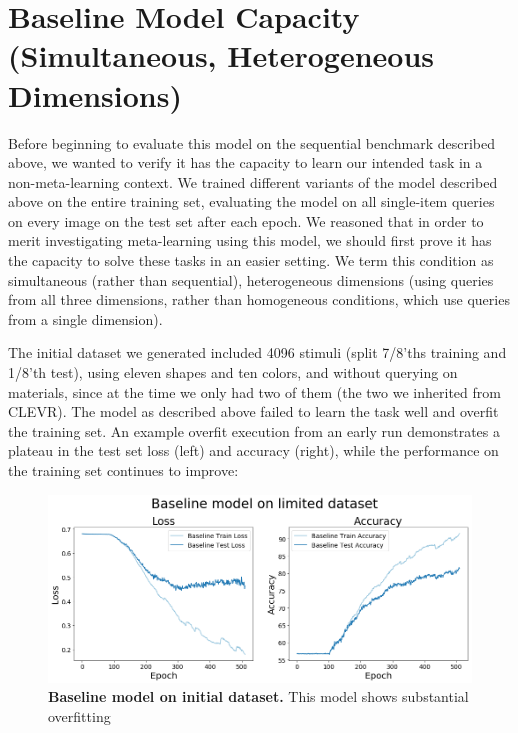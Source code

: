 \section{Baseline Model Capacity (Simultaneous, Heterogeneous Dimensions)}
Before beginning to evaluate this model on the sequential benchmark described above, we wanted to verify it has the capacity to learn our intended task in a non-meta-learning context. We trained different variants of the model described above on the entire training set, evaluating the model on all single-item queries on every image on the test set after each epoch. We reasoned that in order to merit investigating meta-learning using this model, we should first prove it has the capacity to solve these tasks in an easier setting. We term this condition as simultaneous (rather than sequential), heterogeneous dimensions (using queries from all three dimensions, rather than homogeneous conditions, which use queries from a single dimension).

The initial dataset we generated included 4096 stimuli (split 7/8'ths training and 1/8'th test), using eleven shapes and ten colors, and without querying on materials, since at the time we only had two of them (the two we inherited from CLEVR). The model as described above failed to learn the task well and overfit the training set. An example overfit execution from an early run demonstrates a plateau in the test set loss (left) and accuracy (right), while the performance on the training set continues to improve:  

\begin{figure}[!htb]
\centering
\includegraphics[width=\linewidth]{ch-results/figures/baseline/limited_dataset.png}
\caption{{\bf Baseline model on initial dataset.} This model shows substantial overfitting }
\label{fig:results-baseline-limited-dataset}
\end{figure}

